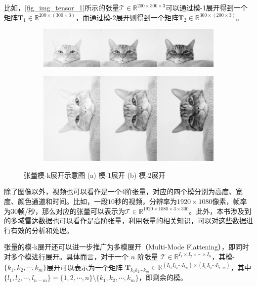 比如，\cref{fig_img_tensor_1}所示的张量\( \mathcal{T} \in \mathbb{R}^{200 \times 300 \times 3} \)可以通过模-1展开得到一个矩阵$\mathbf{T}_1 \in \mathbb{R}^{200 \times (300 \times 3)}$，而通过模-2展开则得到一个矩阵$\mathbf{T}_2 \in \mathbb{R}^{300 \times (200 \times 3)}$。

\begin{figure}[htb!]
    \centering
    \begin{subfigure}{.45\textwidth}
        \centering
        \includegraphics[width=.9\textwidth]{./img/matrix/cat_m2.jpg}
        \caption{}
        \label{fig_mode_k_1}
    \end{subfigure}
    \begin{subfigure}{.3\textwidth}
        \centering
        \includegraphics[width=.9\textwidth]{./img/matrix/cat_m1.jpg}
        \caption{}
        \label{fig_mode_k_2}
    \end{subfigure}
    \caption{张量模-k展开示意图 (a) 模-1展开 (b) 模-2展开}
    \label{fig_mode_k}
\end{figure}

除了图像以外，视频也可以看作是一个4阶张量，对应的四个模分别为高度、宽度、颜色通道和时间。比如，一段\( 10 \)秒的视频，分辨率为\( 1920 \times 1080 \)像素，帧率为\( 30 \)帧/秒，那么对应的张量可以表示为\( \mathcal{T} \in \mathbb{R}^{1920 \times 1080 \times 3 \times 300} \)。此外，本书涉及到的多域雷达数据也可以看作是高阶张量，利用张量的相关知识，可以对这些数据进行有效的分析和处理。

张量的模-k展开还可以进一步推广为多模展开（Multi-Mode Flattening），即同时对多个模进行展开。具体而言，对于一个 $n$ 阶张量 $\mathcal{T} \in \mathbb{R}^{I_1 \times I_2 \times \cdots \times I_n}$，其模-$\{k_1, k_2, \cdots, k_m\}$展开可以表示为一个矩阵 $\mathbf{T}_{k_1k_2 \cdots k_m} \in \mathbb{R}^{(I_{k_1} I_{k_2} \cdots I_{k_m}) \times (I_{l_1} I_{l_2} \cdots I_{l_{n-m}})}$，其中 $\{l_1, l_2, \cdots, l_{n-m}\} = \{1, 2, \cdots, n\} \setminus \{k_1, k_2, \cdots, k_m\}$，即剩余的模。

